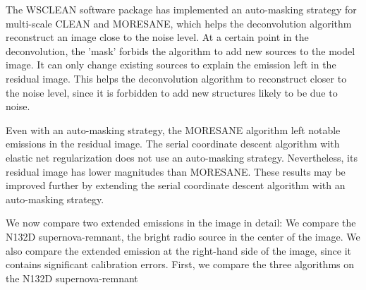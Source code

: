 The WSCLEAN software package has implemented an auto-masking strategy for multi-scale CLEAN and MORESANE, which helps the deconvolution algorithm reconstruct an image close to the noise level. At a certain point in the deconvolution, the 'mask' forbids the algorithm to add new sources to the model image. It can only change existing sources to explain the emission left in the residual image. This helps the deconvolution algorithm to reconstruct closer to the noise level, since it is forbidden to add new structures likely to be due to noise. 

Even with an auto-masking strategy, the MORESANE algorithm left notable emissions in the residual image. The serial coordinate descent algorithm with elastic net regularization does not use an auto-masking strategy. Nevertheless, its residual image has lower magnitudes than MORESANE. These results may be improved further by extending the serial coordinate descent algorithm with an auto-masking strategy.

We now compare two extended emissions in the image in detail: We compare the N132D supernova-remnant, the bright radio source in the center of the image. We also compare the extended emission at the right-hand side of the image, since it contains significant calibration errors. First, we compare the three algorithms on the N132D supernova-remnant

